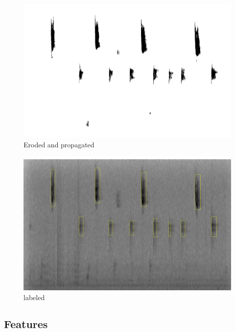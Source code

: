 \documentclass{article} %
\begin{document}
\begin{figure}[ht!]
    \centering
    \includegraphics[width=0.8\linewidth, height=0.3\linewidth]{../Figure/Eroded_and_propagated}
     \centering
    \caption{Eroded and propagated}
    \label{fig:Eroded}
\end{figure}

\begin{figure}[ht!]
    \centering
    \includegraphics[width=0.8\linewidth, height=0.3\linewidth]{../Figure/labeled}
     \centering
    \caption{labeled}
    \label{fig:labeled}
\end{figure}

\subsection{Features}
\label{sec:Features}


\end{document}
